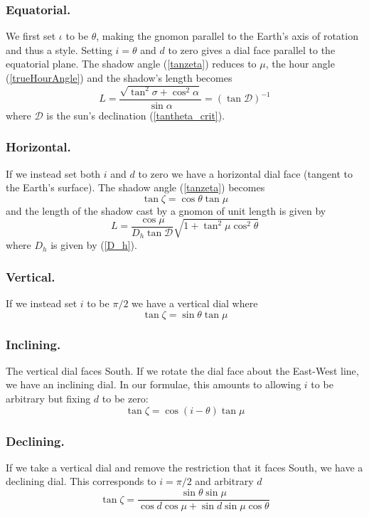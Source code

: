 \documentclass[12pt]{article}
\begin{document}
\subsubsection*{Equatorial.}
%
We first set $\iota$ to be $\theta$, making the gnomon parallel to the Earth's axis of rotation and thus a style. Setting $i = \theta$ and $d$ to zero gives a dial face parallel to the equatorial plane. The shadow angle (\ref{tanzeta}) reduces to $\mu$, the hour angle (\ref{trueHourAngle}) and the shadow's length becomes
%
\begin{equation}
L = \frac{ \sqrt{\tan^2\sigma + \cos^2\alpha} }{\sin\alpha} = (\tan\mathcal{D})^{-1}
\end{equation}
%
where $\mathcal{D}$ is the sun's declination (\ref{tantheta_crit}).
%
\subsubsection*{Horizontal.}
%
If we instead set both $i$ and $d$ to zero we have a horizontal dial face (tangent to the Earth's surface). The shadow angle (\ref{tanzeta}) becomes
%
\begin{equation}
\tan\zeta = \cos\theta\tan\mu
\end{equation}
%
and the length of the shadow cast by a gnomon of unit length is given by
%
\begin{equation}
L = \frac{\cos\mu}{D_h\tan\mathcal{D}}\sqrt{1 + \tan^2\mu\cos^2\theta}
\end{equation}
%
where $D_h$ is given by (\ref{D_h}).
%
\subsubsection*{Vertical.}
%
If we instead set $i$ to be $\pi/2$ we have a vertical dial where
%
\begin{equation}
\tan\zeta = \sin\theta\tan\mu
\end{equation}
%
\subsubsection*{Inclining.}
%
The vertical dial faces South. If we rotate the dial face about the East-West line, we have an inclining dial. In our formulae, this amounts to allowing $i$ to be arbitrary but fixing $d$ to be zero:
%
\begin{equation}
\tan\zeta = \cos(i-\theta)\tan\mu
\end{equation}
%
%
\subsubsection*{Declining.}
%
If we take a vertical dial and remove the restriction that it faces South, we have a declining dial. This corresponds to $i=\pi/2$ and arbitrary $d$
%
\begin{equation}
\tan\zeta = \frac{\sin\theta\sin\mu}{\cos d\cos\mu + \sin d\sin\mu\cos\theta}
\end{equation}
%
%
\end{document}
